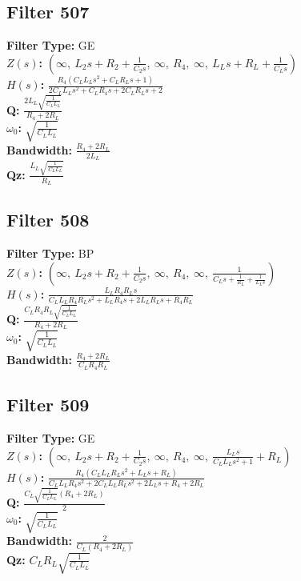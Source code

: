 \documentclass{article}
\begin{document}
\subsection*{Filter 507}
\textbf{Filter Type:} GE \\ 
\textbf{$Z(s)$:} $\left( \infty, \  L_{2} s + R_{2} + \frac{1}{C_{2} s}, \  \infty, \  R_{4}, \  \infty, \  L_{L} s + R_{L} + \frac{1}{C_{L} s}\right)$ \\ 
\textbf{$H(s)$:} $\frac{R_{4} \left(C_{L} L_{L} s^{2} + C_{L} R_{L} s + 1\right)}{2 C_{L} L_{L} s^{2} + C_{L} R_{4} s + 2 C_{L} R_{L} s + 2}$ \\ 
\textbf{Q:} $\frac{2 L_{L} \sqrt{\frac{1}{C_{L} L_{L}}}}{R_{4} + 2 R_{L}}$ \\ 
\textbf{$\omega_0$:} $\sqrt{\frac{1}{C_{L} L_{L}}}$ \\ 
\textbf{Bandwidth:} $\frac{R_{4} + 2 R_{L}}{2 L_{L}}$ \\ 
\textbf{Qz:} $\frac{L_{L} \sqrt{\frac{1}{C_{L} L_{L}}}}{R_{L}}$ \\ 
\subsection*{Filter 508}
\textbf{Filter Type:} BP \\ 
\textbf{$Z(s)$:} $\left( \infty, \  L_{2} s + R_{2} + \frac{1}{C_{2} s}, \  \infty, \  R_{4}, \  \infty, \  \frac{1}{C_{L} s + \frac{1}{R_{L}} + \frac{1}{L_{L} s}}\right)$ \\ 
\textbf{$H(s)$:} $\frac{L_{L} R_{4} R_{L} s}{C_{L} L_{L} R_{4} R_{L} s^{2} + L_{L} R_{4} s + 2 L_{L} R_{L} s + R_{4} R_{L}}$ \\ 
\textbf{Q:} $\frac{C_{L} R_{4} R_{L} \sqrt{\frac{1}{C_{L} L_{L}}}}{R_{4} + 2 R_{L}}$ \\ 
\textbf{$\omega_0$:} $\sqrt{\frac{1}{C_{L} L_{L}}}$ \\ 
\textbf{Bandwidth:} $\frac{R_{4} + 2 R_{L}}{C_{L} R_{4} R_{L}}$ \\ 
\subsection*{Filter 509}
\textbf{Filter Type:} GE \\ 
\textbf{$Z(s)$:} $\left( \infty, \  L_{2} s + R_{2} + \frac{1}{C_{2} s}, \  \infty, \  R_{4}, \  \infty, \  \frac{L_{L} s}{C_{L} L_{L} s^{2} + 1} + R_{L}\right)$ \\ 
\textbf{$H(s)$:} $\frac{R_{4} \left(C_{L} L_{L} R_{L} s^{2} + L_{L} s + R_{L}\right)}{C_{L} L_{L} R_{4} s^{2} + 2 C_{L} L_{L} R_{L} s^{2} + 2 L_{L} s + R_{4} + 2 R_{L}}$ \\ 
\textbf{Q:} $\frac{C_{L} \sqrt{\frac{1}{C_{L} L_{L}}} \left(R_{4} + 2 R_{L}\right)}{2}$ \\ 
\textbf{$\omega_0$:} $\sqrt{\frac{1}{C_{L} L_{L}}}$ \\ 
\textbf{Bandwidth:} $\frac{2}{C_{L} \left(R_{4} + 2 R_{L}\right)}$ \\ 
\textbf{Qz:} $C_{L} R_{L} \sqrt{\frac{1}{C_{L} L_{L}}}$ \\ 
\end{document}
